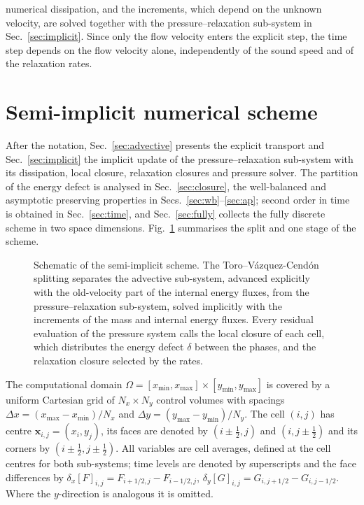 numerical dissipation, and the increments, which depend on the unknown velocity, are solved together with the
pressure--relaxation sub-system in Sec.~\ref{sec:implicit}. Since only the flow velocity enters the explicit step, the time step depends
on the flow velocity alone, independently of the sound speed and of the relaxation rates.
\section{Semi-implicit numerical scheme}
\label{sec:method}

After the notation, Sec.~\ref{sec:advective} presents the explicit
transport and Sec.~\ref{sec:implicit} the implicit update of the pressure--relaxation sub-system with its
dissipation, local closure, relaxation closures and pressure solver. The partition of the energy defect is analysed in
Sec.~\ref{sec:closure}, the well-balanced and asymptotic preserving properties in Secs.~\ref{sec:wb}--\ref{sec:ap}; second order in time is obtained in Sec.~\ref{sec:time}, and
Sec.~\ref{sec:fully} collects the fully discrete scheme in two space dimensions.
Fig.~\ref{fig:scheme} summarises the split and one stage of the scheme.

\begin{figure}[p]
\centering
\resizebox*{!}{0.84\textheight}{}
\caption{Schematic of the semi-implicit scheme. The Toro--V\'azquez-Cend\'on splitting separates the advective
sub-system, advanced explicitly with the old-velocity part of the internal energy fluxes, from the pressure--relaxation
sub-system, solved implicitly with the increments of the mass and internal energy fluxes. Every residual evaluation of the pressure system calls the local closure of each cell, which
distributes the energy defect $\delta$ between the phases, and the relaxation closure selected by the rates.}
\label{fig:scheme}
\end{figure}

The computational domain $\Omega=[x_{\min},x_{\max}]\times[y_{\min},y_{\max}]$ is covered by a uniform Cartesian grid of
$N_x\times N_y$ control volumes with spacings $\Delta x=(x_{\max}-x_{\min})/N_x$ and $\Delta y=(y_{\max}-y_{\min})/N_y$. The cell $(i,j)$ has
centre $\mathbf x_{i,j}=(x_i,y_j)$, its faces are denoted by $(i\pm\tfrac12,j)$ and $(i,j\pm\tfrac12)$ and its corners by
$(i\pm\tfrac12,j\pm\tfrac12)$. All variables are cell averages, defined at the cell centres for both sub-systems; time levels
are denoted by superscripts and the face differences by $\delta_x[F]_{i,j}=F_{i+1/2,j}-F_{i-1/2,j}$,
$\delta_y[G]_{i,j}=G_{i,j+1/2}-G_{i,j-1/2}$. Where the $y$-direction is analogous it is omitted.

